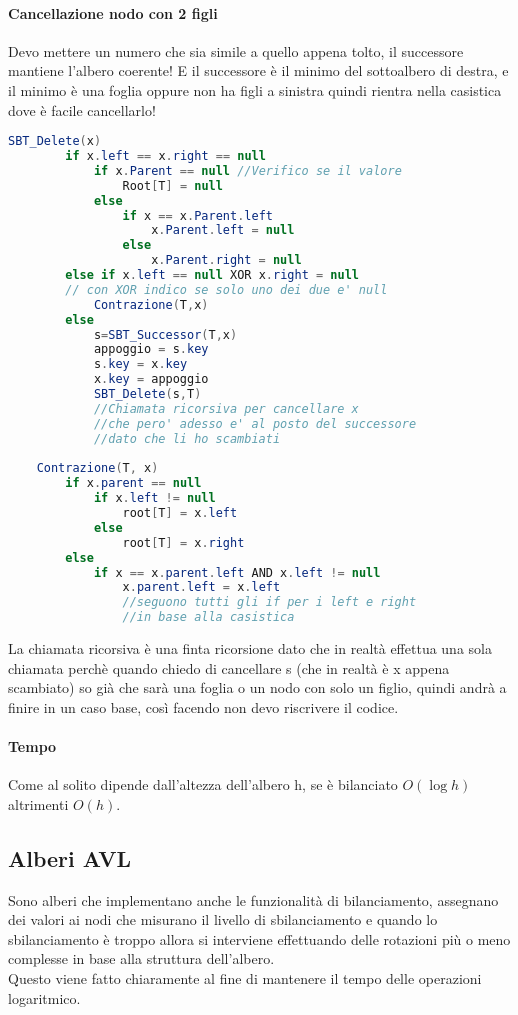 \paragraph*{Cancellazione nodo con 2 figli} Devo mettere un numero che sia simile a quello
appena tolto, il successore mantiene l'albero coerente! E il successore è il minimo del sottoalbero di
destra, e il minimo è una foglia oppure non ha figli a sinistra quindi rientra nella casistica
dove è facile cancellarlo!
\begin{lstlisting}[language=Java]
    SBT_Delete(x)
        if x.left == x.right == null
            if x.Parent == null //Verifico se il valore 
                Root[T] = null
            else
                if x == x.Parent.left
                    x.Parent.left = null
                else
                    x.Parent.right = null
        else if x.left == null XOR x.right = null
        // con XOR indico se solo uno dei due e' null
            Contrazione(T,x)
        else
            s=SBT_Successor(T,x)
            appoggio = s.key
            s.key = x.key
            x.key = appoggio
            SBT_Delete(s,T)
            //Chiamata ricorsiva per cancellare x
            //che pero' adesso e' al posto del successore
            //dato che li ho scambiati
    
    Contrazione(T, x)
        if x.parent == null
            if x.left != null
                root[T] = x.left
            else
                root[T] = x.right
        else 
            if x == x.parent.left AND x.left != null
                x.parent.left = x.left
                //seguono tutti gli if per i left e right
                //in base alla casistica
\end{lstlisting}
La chiamata ricorsiva è una finta ricorsione dato che in realtà effettua una sola
chiamata perchè quando chiedo di cancellare s (che in realtà è x appena scambiato) so già
che sarà una foglia o un nodo con solo un figlio, quindi andrà a finire in un caso base,
così facendo non devo riscrivere il codice.
\paragraph*{Tempo} Come al solito dipende dall'altezza dell'albero h, se è bilanciato
$O(\log h)$ altrimenti $O(h)$.
\subsection{Alberi AVL}
Sono alberi che implementano anche le funzionalità di bilanciamento, assegnano dei valori ai nodi
che misurano il livello di sbilanciamento e quando lo sbilanciamento è troppo allora si interviene
effettuando delle rotazioni più o meno complesse in base alla struttura dell'albero.\\
Questo viene fatto chiaramente al fine di mantenere il tempo delle operazioni logaritmico.
